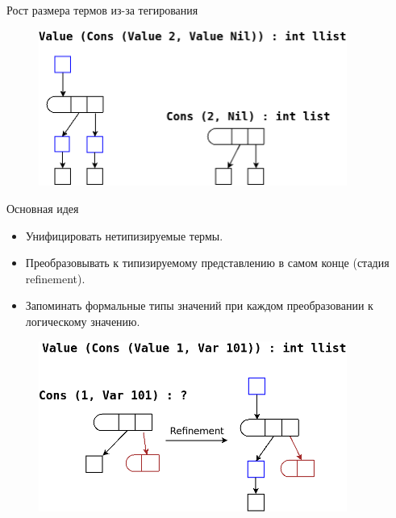 \documentclass[10pt, mathserif]{beamer}
\theoremstyle{definition}
\begin{document}
\begin{frame}[fragile]{Рост размера термов из-за тегирования}
\begin{figure}
\centering
\includegraphics[width=0.9\textwidth]{img4.png}
\end{figure}
\end{frame}

\begin{frame}[fragile]{Основная идея}
\begin{itemize}
 \item Унифицировать нетипизируемые термы.
 \item Преобразовывать к типизируемому представлению в самом конце (стадия refinement).
 \item Запоминать формальные типы значений при каждом преобразовании к логическому значению.
\end{itemize}

\begin{figure}
\centering
\includegraphics[width=0.9\textwidth]{img5.png}
\end{figure}
\end{frame}
\end{document}
